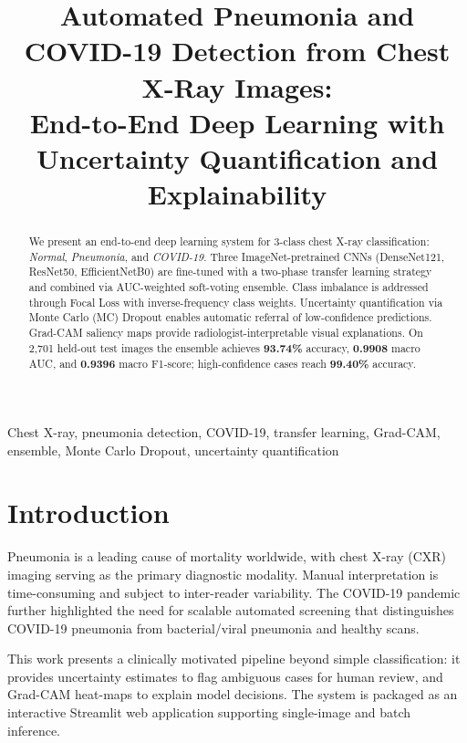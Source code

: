 \documentclass{article}
\title{Automated Pneumonia and COVID-19 Detection from Chest X-Ray Images:\\
  {\large End-to-End Deep Learning with Uncertainty Quantification and Explainability}}
\begin{document}
\maketitle

\begin{abstract}
We present an end-to-end deep learning system for 3-class chest X-ray classification:
\textit{Normal}, \textit{Pneumonia}, and \textit{COVID-19}.
Three ImageNet-pretrained CNNs (DenseNet121, ResNet50, EfficientNetB0) are fine-tuned
with a two-phase transfer learning strategy and combined via AUC-weighted soft-voting
ensemble. Class imbalance is addressed through Focal Loss with inverse-frequency
class weights. Uncertainty quantification via Monte Carlo (MC) Dropout enables
automatic referral of low-confidence predictions. Grad-CAM saliency maps provide
radiologist-interpretable visual explanations. On 2{,}701 held-out test images the
ensemble achieves \textbf{93.74\%} accuracy, \textbf{0.9908} macro AUC, and
\textbf{0.9396} macro F1-score; high-confidence cases reach \textbf{99.40\%} accuracy.
\end{abstract}

\begin{keywords}
Chest X-ray, pneumonia detection, COVID-19, transfer learning, Grad-CAM, ensemble,
Monte Carlo Dropout, uncertainty quantification
\end{keywords}

\section{Introduction}
\label{sec:intro}

Pneumonia is a leading cause of mortality worldwide, with chest X-ray (CXR) imaging
serving as the primary diagnostic modality. Manual interpretation is time-consuming
and subject to inter-reader variability. The COVID-19 pandemic further highlighted the
need for scalable automated screening that distinguishes COVID-19 pneumonia from
bacterial/viral pneumonia and healthy scans.

This work presents a clinically motivated pipeline beyond simple classification:
it provides uncertainty estimates to flag ambiguous cases for human review, and
Grad-CAM heat-maps to explain model decisions. The system is packaged as an
interactive Streamlit web application supporting single-image and batch inference.
\end{document}
